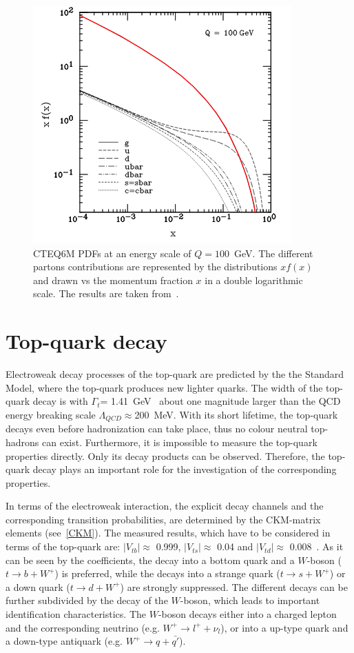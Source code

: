  




\begin{figure}[h]
	\centering
	\includegraphics[width=0.55\linewidth]{Pics/cp1/PDF.png}
	\caption{ CTEQ6M PDFs  at an energy scale of $Q=100$~GeV. The different partons contributions are represented by the distributions $xf(x)$ and drawn vs the momentum fraction $x$ in a double logarithmic scale. The results are taken from~\cite{Pumplin:2002vw}.} 
	\label{fig:PDF}
\end{figure}


\section{Top-quark decay}\label{decay1}
Electroweak decay processes of the top-quark are predicted by the the Standard Model, where the top-quark produces new lighter quarks.  
The width of the top-quark decay is with $\Gamma_t$= 1.41~GeV~\cite{Olive:2016xmw} about one magnitude larger than the QCD energy breaking scale $\Lambda_{QCD}\approx$200~MeV. With its short lifetime, the top-quark decays even before  
hadronization can take place, thus no colour neutral top-hadrons can exist. Furthermore,  it is impossible to measure the top-quark properties directly. Only its decay products can be observed. Therefore, the top-quark decay plays an  important role for the investigation of the corresponding properties.


 In terms of the electroweak interaction, the explicit decay channels and the corresponding transition probabilities, are determined by the CKM-matrix elements (see~\cref{CKM}). The measured results, which have to be considered in terms of the top-quark are: $|V_{tb}| \approx$ 0.999,  $|V_{ts}|\approx$ 0.04 and  $|V_{td}|\approx$ 0.008~\cite{Olive:2016xmw}. 
As it can be seen by the coefficients, the decay into a bottom quark and a $W$-boson ($t \rightarrow b + W^+ $) is preferred, while the decays into a strange quark ($t \rightarrow s + W^+ $) or  a down quark ($t \rightarrow d + W^+ $) are strongly suppressed. The different decays can be further subdivided by the decay of the $W$-boson, which leads to important identification characteristics. The $W$-boson decays either into a charged lepton and the corresponding neutrino (e.g. $W^+\rightarrow l^+ + \nu_l$), or into a up-type quark and a down-type antiquark  (e.g. $W^+\rightarrow q + \bar{q'}$). 

